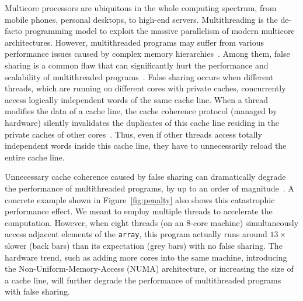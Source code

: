 Multicore processors are ubiquitous in the whole computing spectrum, from mobile phones, personal desktops, to high-end servers. Multithreading is the de-facto programming model to exploit the massive parallelism of modern multicore architectures.
However, multithreaded programs may suffer from various performance issues caused by complex memory hierarchies~\cite{ibs-sc,ibs-sc2,Dramon}. Among them, false sharing is a common flaw that can significantly hurt the performance and scalability of multithreaded programs~\cite{falseshare:effect}. False sharing occurs when different threads, which are running on different cores with private caches, concurrently access logically independent words of the same cache line. When a thread modifies the data of a cache line, the cache coherence protocol (managed by hardware) silently invalidates the duplicates of this cache line residing in the private caches of other cores~\cite{MESI}. Thus, even if other threads access totally independent words inside this cache line, they have to unnecessarily reload the entire cache line. 

Unnecessary cache coherence caused by false sharing can dramatically degrade the performance of multithreaded programs, by up to an order of magnitude~\cite{falseshare:effect}. A concrete example shown in Figure~\ref{fig:penalty} also shows this catastrophic performance effect. We meant to employ multiple threads to accelerate the computation. However, when eight threads (on an 8-core machine) simultaneously access adjacent elements of the {\tt array}, this program actually runs around $13\times$ slower (back bars) than its expectation (grey bars) with no false sharing.
The hardware trend, such as adding more cores into the same machine, introducing the Non-Uniform-Memory-Access (NUMA) architecture, or increasing the size of a cache line, will further degrade the performance of multithreaded programs with false sharing.

